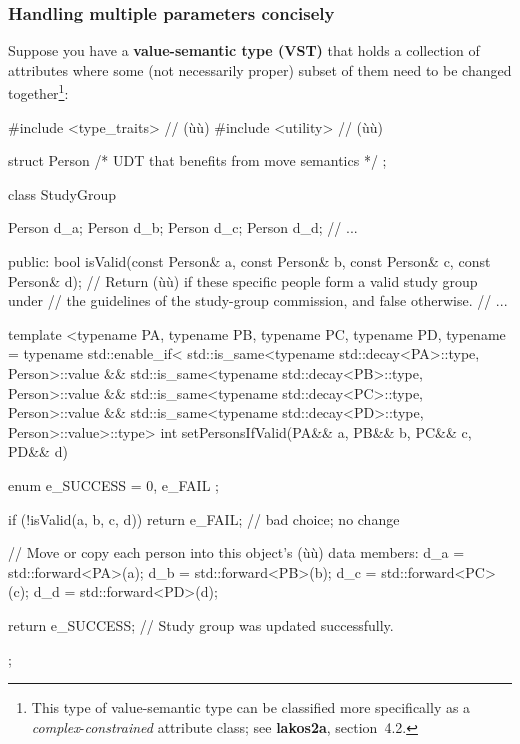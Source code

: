 \subsubsection[Handling multiple parameters concisely]{Handling multiple parameters concisely}\label{handling-multiple-parameters-concisely}

Suppose you have a \textbf{value-semantic type (VST)} that holds a
collection of attributes where some (not necessarily proper) subset of
them need to be changed together{\cprotect\footnote{This type of
value-semantic type can be classified more specifically as a
\emph{complex}-\emph{constrained} attribute class; see \textbf{lakos2a}, section~4.2.}}:

\begin{emcppslisting}
#include <type_traits>  // (ù{}ù)
#include <utility>      // (ù{}ù)

struct Person { /* UDT that benefits from move semantics */ };

class StudyGroup
{
    Person d_a;
    Person d_b;
    Person d_c;
    Person d_d;
    // ...

public:
    bool isValid(const Person& a, const Person& b, const Person& c, const Person& d);
        // Return (ù{}ù) if these specific people form a valid study group under
        // the guidelines of the study-group commission, and false otherwise.
    // ...

    template <typename PA, typename PB, typename PC, typename PD,
        typename = typename std::enable_if<
            std::is_same<typename std::decay<PA>::type, Person>::value &&
            std::is_same<typename std::decay<PB>::type, Person>::value &&
            std::is_same<typename std::decay<PC>::type, Person>::value &&
            std::is_same<typename std::decay<PD>::type, Person>::value>::type>
    int setPersonsIfValid(PA&& a, PB&& b, PC&& c, PD&& d)
    {
        enum { e_SUCCESS = 0, e_FAIL };

        if (!isValid(a, b, c, d))
        {
            return e_FAIL;  // bad choice; no change
        }

        // Move or copy each person into this object's (ù{}ù) data members:
        d_a = std::forward<PA>(a);
        d_b = std::forward<PB>(b);
        d_c = std::forward<PC>(c);
        d_d = std::forward<PD>(d);

        return e_SUCCESS;  // Study group was updated successfully.
    }
};
\end{emcppslisting}

